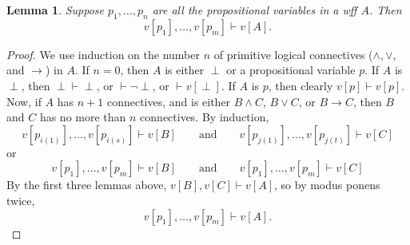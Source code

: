 \documentclass[12pt]{article}
\newtheorem{lem}{Lemma}
\begin{document}
\begin{lem}  Suppose $p_1,\ldots, p_n$ are all the propositional variables in a wff $A$.  Then
$$v[p_1], \ldots, v[p_m] \vdash v[A].$$
\end{lem}
\begin{proof}  We use induction on the number $n$ of primitive logical connectives ($\land, \lor$, and $\to$) in $A$.  If $n=0$, then $A$ is either $\perp$ or a propositional variable $p$.  If $A$ is $\perp$, then $\perp \vdash \perp$, or $\vdash \neg \perp$, or $\vdash v[\perp]$.  If $A$ is $p$, then clearly $v[p]\vdash v[p]$.  Now, if $A$ has $n+1$ connectives, and is either $B\land C$, $B\lor C$, or $B\to C$, then $B$ and $C$ has no more than $n$ connectives. By induction, $$v[p_{i(1)}],\ldots, v[p_{i(s)}]\vdash v[B]\qquad \mbox{and} \qquad v[p_{j(1)}],\ldots, v[p_{j(t)}]\vdash v[C]$$
or $$v[p_1],\ldots, v[p_m]\vdash v[B]\qquad \mbox{and} \qquad v[p_1],\ldots, v[p_m]\vdash v[C]$$
By the first three lemmas above, $v[B],v[C]\vdash v[A]$, so by modus ponens twice,
$$v[p_1],\ldots, v[p_m]\vdash v[A].$$
\end{proof}
\end{document}
